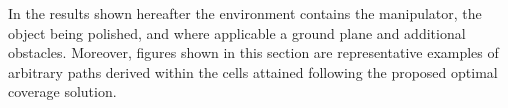 \documentclass[journal]{IEEEtran}
\begin{document}
In the results shown hereafter 
the environment contains the manipulator, the object being polished, and where applicable a ground plane and additional obstacles. 
Moreover, figures shown in this section are representative examples of arbitrary paths derived within the cells attained following the proposed optimal coverage solution. 

\end{document}
